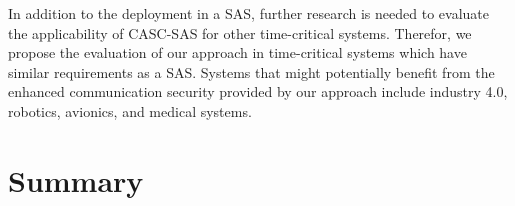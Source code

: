 In addition to the deployment in a SAS, further research is needed to evaluate the applicability of CASC-SAS for other time-critical systems.
Therefor, we propose the evaluation of our approach in time-critical systems which have similar requirements as a SAS.
Systems that might potentially benefit from the enhanced communication security provided by our approach include industry 4.0, robotics, avionics, and medical systems.

\section{Summary}
\label{sec:conclusion:summary}
